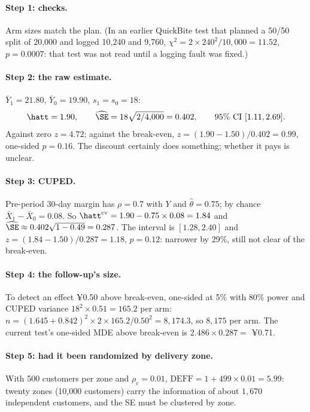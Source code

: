 \documentclass[11pt]{article}
\begin{document}
\paragraph{Step 1: checks.} Arm sizes match the plan. (In an earlier QuickBite test that planned a 50/50 split
of 20{,}000 and logged 10{,}240 and 9{,}760, $\chi^2 = 2 \times 240^2/10{,}000 = 11.52$, $p = 0.0007$: that test
was not read until a logging fault was fixed.)

\paragraph{Step 2: the raw estimate.} $\bar Y_1 = 21.80$, $\bar Y_0 = 19.90$, $s_1 = s_0 = 18$:
\[
  \hatt = 1.90, \qquad \widehat\SE = 18\sqrt{2/4{,}000} = 0.402, \qquad \text{95\% CI } [1.11, 2.69].
\]
Against zero $z = 4.72$; against the break-even, $z = (1.90 - 1.50)/0.402 = 0.99$, one-sided $p = 0.16$. The
discount certainly does something; whether it pays is unclear.

\paragraph{Step 3: CUPED.} Pre-period 30-day margin has $\rho = 0.7$ with $Y$ and $\hat\theta = 0.75$; by chance
$\bar X_1 - \bar X_0 = 0.08$. So $\hatt^{\text{cv}} = 1.90 - 0.75 \times 0.08 = 1.84$ and
$\widehat\SE \approx 0.402\sqrt{1 - 0.49} = 0.287$. The interval is $[1.28, 2.40]$ and $z = (1.84 - 1.50)/0.287 = 1.18$,
$p = 0.12$: narrower by 29\%, still not clear of the break-even.

\paragraph{Step 4: the follow-up's size.} To detect an effect ¥0.50 above break-even, one-sided at 5\% with
80\% power and CUPED variance $18^2 \times 0.51 = 165.2$ per arm:
$n = (1.645 + 0.842)^2 \times 2 \times 165.2/0.50^2 = 8{,}174.3$, so $8{,}175$ per arm. The current test's one-sided MDE above
break-even is $2.486 \times 0.287 = $ ¥0.71.

\paragraph{Step 5: had it been randomized by delivery zone.} With 500 customers per zone and $\rho_c = 0.01$,
$\text{DEFF} = 1 + 499 \times 0.01 = 5.99$: twenty zones (10{,}000 customers) carry the information of about
$1{,}670$ independent customers, and the SE must be clustered by zone.
\end{document}
